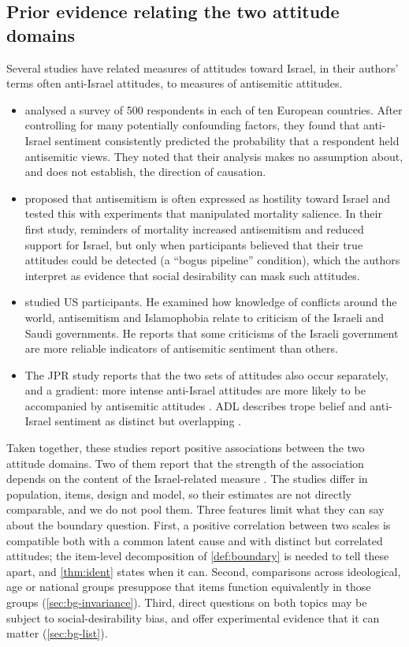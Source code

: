 \subsection{Prior evidence relating the two attitude domains}\label{sec:bg-prior}

Several studies have related measures of attitudes toward Israel, in their authors' terms often anti-Israel attitudes, to measures of antisemitic attitudes.
\begin{itemize}
  \item \citet{kaplan2006} analysed a survey of 500 respondents in each of ten European countries. After controlling for many potentially confounding factors, they found that anti-Israel sentiment consistently predicted the probability that a respondent held antisemitic views. They noted that their analysis makes no assumption about, and does not establish, the direction of causation.
  \item \citet{cohen2009} proposed that antisemitism is often expressed as hostility toward Israel and tested this with experiments that manipulated mortality salience. In their first study, reminders of mortality increased antisemitism and reduced support for Israel, but only when participants believed that their true attitudes could be detected (a ``bogus pipeline'' condition), which the authors interpret as evidence that social desirability can mask such attitudes.
  \item \citet{beattie2017} studied US participants. He examined how knowledge of conflicts around the world, antisemitism and Islamophobia relate to criticism of the Israeli and Saudi governments. He reports that some criticisms of the Israeli government are more reliable indicators of antisemitic sentiment than others.
  \item The JPR study reports that the two sets of attitudes also occur separately, and a gradient: more intense anti-Israel attitudes are more likely to be accompanied by antisemitic attitudes \citep{staetsky2017}. ADL describes trope belief and anti-Israel sentiment as distinct but overlapping \citep{adl2023attitudes}.
\end{itemize}
Taken together, these studies report positive associations between the two attitude domains. Two of them report that the strength of the association depends on the content of the Israel-related measure \citep{beattie2017,staetsky2017}. The studies differ in population, items, design and model, so their estimates are not directly comparable, and we do not pool them. Three features limit what they can say about the boundary question. First, a positive correlation between two scales is compatible both with a common latent cause and with distinct but correlated attitudes; the item-level decomposition of \cref{def:boundary} is needed to tell these apart, and \cref{thm:ident} states when it can. Second, comparisons across ideological, age or national groups presuppose that items function equivalently in those groups (\cref{sec:bg-invariance}). Third, direct questions on both topics may be subject to social-desirability bias, and \citet{cohen2009} offer experimental evidence that it can matter (\cref{sec:bg-list}).

